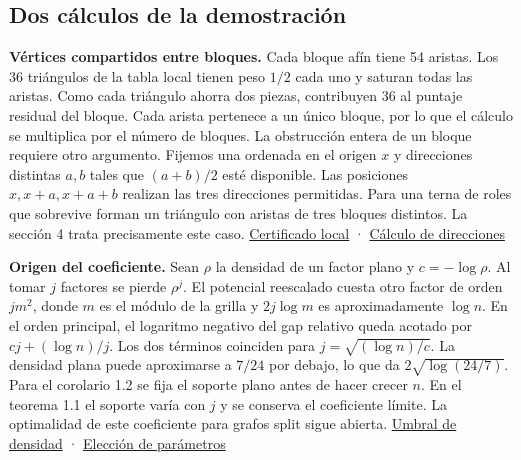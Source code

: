 \documentclass[spanish,11pt,a4paper]{article}
\begin{document}
\subsection{Dos cálculos de la demostración}\label{dos-cuxe1lculos-de-la-demostraciuxf3n}

\textbf{Vértices compartidos entre bloques.} Cada bloque afín tiene 54 aristas. Los 36 triángulos de la tabla local tienen peso \(1/2\) cada uno y saturan todas las aristas. Como cada triángulo ahorra dos piezas, contribuyen 36 al puntaje residual del bloque. Cada arista pertenece a un único bloque, por lo que el cálculo se multiplica por el número de bloques. La obstrucción entera de un bloque requiere otro argumento. Fijemos una ordenada en el origen \(x\) y direcciones distintas \(a,b\) tales que \((a+b)/2\) esté disponible. Las posiciones \(x,x+a,x+a+b\) realizan las tres direcciones permitidas. Para una terna de roles que sobrevive forman un triángulo con aristas de tres bloques distintos. La sección 4 trata precisamente este caso. \href{https://github.com/jtraverso/split-clique-partition-gap/blob/ccb5444b2ecdff9de1d6221133633a25a224953d/R434/LocalH54.lean}{Certificado local} · \href{https://github.com/jtraverso/split-clique-partition-gap/blob/ccb5444b2ecdff9de1d6221133633a25a224953d/R434/CoreDirections.lean}{Cálculo de direcciones}

\textbf{Origen del coeficiente.} Sean \(\rho\) la densidad de un factor plano y \(c=-\log\rho\). Al tomar \(j\) factores se pierde \(\rho^j\). El potencial reescalado cuesta otro factor de orden \(jm^2\), donde \(m\) es el módulo de la grilla y \(2j\log m\) es aproximadamente \(\log n\). En el orden principal, el logaritmo negativo del gap relativo queda acotado por \(cj+(\log n)/j\). Los dos términos coinciden para \(j=\sqrt{(\log n)/c}\). La densidad plana puede aproximarse a \(7/24\) por debajo, lo que da \(2\sqrt{\log(24/7)}\). Para el corolario 1.2 se fija el soporte plano antes de hacer crecer \(n\). En el teorema 1.1 el soporte varía con \(j\) y se conserva el coeficiente límite. La optimalidad de este coeficiente para grafos split sigue abierta. \href{https://github.com/jtraverso/split-clique-partition-gap/blob/ccb5444b2ecdff9de1d6221133633a25a224953d/R434/DensityThreshold.lean}{Umbral de densidad} · \href{https://github.com/jtraverso/split-clique-partition-gap/blob/ccb5444b2ecdff9de1d6221133633a25a224953d/R434/UniformOrder.lean}{Elección de parámetros}
\end{document}
